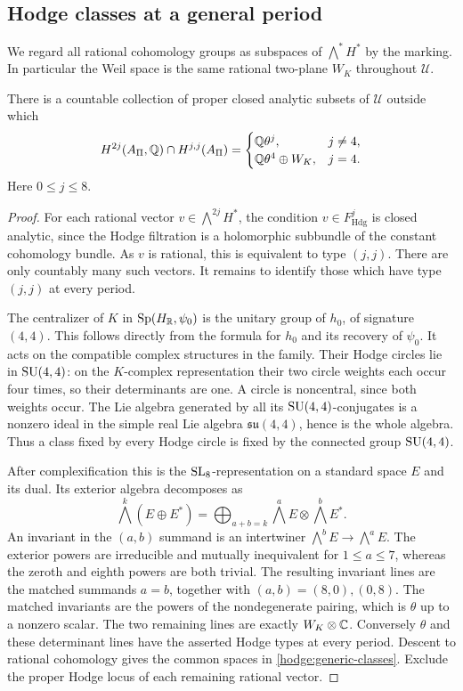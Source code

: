 \subsection{Hodge classes at a general period}

We regard all rational cohomology groups as subspaces of
$\bigwedge^*H^*$ by the marking.  In particular the Weil space is the
same rational two-plane $W_K$ throughout $\mathcal U$.

\begin{proposition}
\label{hodge:generic-hodge}
There is a countable collection of proper closed analytic subsets of
$\mathcal U$ outside which
\begin{equation}
 H^{2j}(A_\Pi,\mathbb Q)\cap H^{j,j}(A_\Pi)=
 \begin{cases}
  \mathbb Q\theta^j,&j\ne4,\\
  \mathbb Q\theta^4\oplus W_K,&j=4.
 \end{cases}
 \label{hodge:generic-classes}
\end{equation}
Here $0\le j\le8$.
\end{proposition}

\begin{proof}
For each rational vector $v\in\bigwedge^{2j}H^*$, the condition
$v\in F^j_{\mathrm{Hdg}}$ is closed analytic, since the Hodge filtration
is a holomorphic subbundle of the constant cohomology bundle.
As $v$ is rational, this is equivalent to type $(j,j)$.
There are only countably many such vectors.  It remains to identify those
which have type $(j,j)$ at every period.

The centralizer of $K$ in $\operatorname{Sp}(H_\mathbb R,\psi_0)$ is the unitary group of
$h_0$, of signature $(4,4)$.  This follows directly from the formula for
$h_0$ and its recovery of $\psi_0$.  It acts on the compatible complex
structures in the family.  Their Hodge circles lie in $\operatorname{SU}(4,4)$:
on the $K$-complex representation their two circle weights each occur
four times, so their determinants are one.  A circle is noncentral,
since both weights occur.  The Lie algebra generated by all its
$\operatorname{SU}(4,4)$-conjugates is a nonzero ideal in the simple real Lie algebra
$\mathfrak{su}(4,4)$, hence is the whole algebra.  Thus a class fixed
by every Hodge circle is fixed by the connected group $\operatorname{SU}(4,4)$.

After complexification this is the $\operatorname{SL}_8$-representation on a standard
space $E$ and its dual.  Its exterior algebra decomposes as
\[
 \bigwedge^k(E\oplus E^*)=
 \bigoplus_{a+b=k}\bigwedge^aE\otimes\bigwedge^bE^*.
\]
An invariant in the $(a,b)$ summand is an intertwiner
$\bigwedge^bE\to\bigwedge^aE$.  The exterior powers are irreducible
and mutually inequivalent for $1\le a\le7$, whereas the zeroth and
eighth powers are both trivial.  The resulting invariant lines are the
matched summands $a=b$, together with $(a,b)=(8,0),(0,8)$.
The matched invariants are the powers of the nondegenerate pairing,
which is $\theta$ up to a nonzero scalar.  The two remaining lines are
exactly $W_K\otimes\mathbb C$.  Conversely $\theta$ and these determinant
lines have the asserted Hodge types at every period.  Descent to rational
cohomology gives the common spaces in \eqref{hodge:generic-classes}.
Exclude the proper Hodge locus of each remaining rational vector.
\end{proof}

